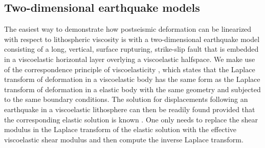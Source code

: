 \documentclass[extra]{gji}
\begin{document}
\subsection{Two-dimensional earthquake models}
The easiest way to demonstrate how postseismic deformation can be
linearized with respect to lithospheric viscosity is with a
two-dimensional earthquake model consisting of a long, vertical,
surface rupturing, strike-slip fault that is embedded in a
viscoelastic horizontal layer overlying a viscoelastic halfspace.  We
make use of the correspondence principle of viscoelasticity
\citep[e.g.][]{F1975}, which states that the Laplace transform of
deformation in a viscoelastic body has the same form as the Laplace
transform of deformation in a elastic body with the same geometry and
subjected to the same boundary conditions. The solution for
displacements following an earthquake in a viscoelastic lithosphere
can then be readily found provided that the corresponding elastic
solution is known \citep[e.g.][]{NM1974,SP1978,HH2005}.  One only
needs to replace the shear modulus in the Laplace transform of the
elastic solution with the effective viscoelastic shear modulus and
then compute the inverse Laplace transform.
\end{document}
